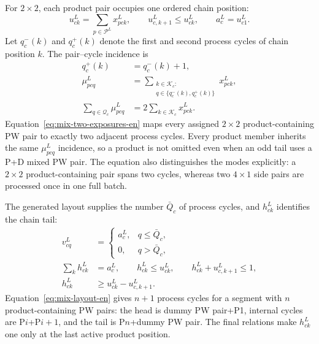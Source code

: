\documentclass[journal]{IEEEtran}
\begin{document}
For $2\times2$, each product pair occupies one ordered chain position:
\begin{equation}
u^L_{ck}=\sum_{p\in\mathcal P^L}x^L_{pck},\qquad
u^L_{c,k+1}\le u^L_{ck},\qquad
a^L_c=u^L_{c1}.
\label{eq:mix-position-en}
\end{equation}
Let $q_c^-(k)$ and $q_c^+(k)$ denote the first and second process cycles of chain position $k$. The pair--cycle incidence is
\begin{equation}
\begin{aligned}
q_c^+(k)&=q_c^-(k)+1,\\
\mu^L_{pcq}
&=\sum_{\substack{k\in\mathcal K_c:\\q\in\{q_c^-(k),q_c^+(k)\}}}x^L_{pck},\\
\sum_{q\in\mathcal Q_c}\mu^L_{pcq}
&=2\sum_{k\in\mathcal K_c}x^L_{pck}.
\end{aligned}
\label{eq:mix-two-exposures-en}
\end{equation}
Equation~\eqref{eq:mix-two-exposures-en} maps every assigned $2\times2$ product-containing PW pair to exactly two adjacent process cycles. Every product member inherits the same $\mu^L_{pcq}$ incidence, so a product is not omitted even when an odd tail uses a P+D mixed PW pair. The equation also distinguishes the modes explicitly: a $2\times2$ product-containing pair spans two cycles, whereas two $4\times1$ side pairs are processed once in one full batch.

The generated layout supplies the number $\bar Q_c$ of process cycles, and $h^L_{ck}$ identifies the chain tail:
\begin{equation}
\begin{aligned}
v^L_{cq}&=
\begin{cases}a^L_c,&q\le\bar Q_c,\\0,&q>\bar Q_c,
\end{cases}\\
\sum_k h^L_{ck}&=a^L_c,\qquad
h^L_{ck}\le u^L_{ck},\qquad
h^L_{ck}+u^L_{c,k+1}\le1,\\
h^L_{ck}&\ge u^L_{ck}-u^L_{c,k+1}.
\end{aligned}
\label{eq:mix-layout-en}
\end{equation}
Equation~\eqref{eq:mix-layout-en} gives $n+1$ process cycles for a segment with $n$ product-containing PW pairs: the head is dummy PW pair+P1, internal cycles are P$i$+P$i+1$, and the tail is P$n$+dummy PW pair. The final relations make $h^L_{ck}$ one only at the last active product position.
\end{document}
